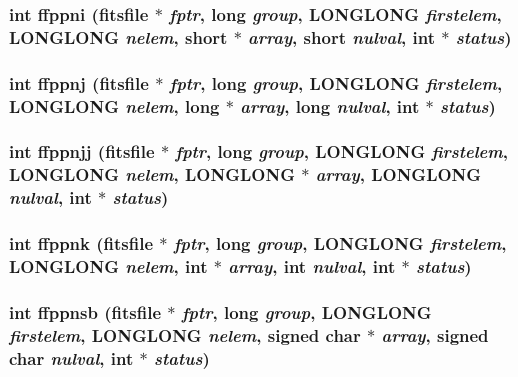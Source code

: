 \subsubsection{\setlength{\rightskip}{0pt plus 5cm}int ffppni (\bf{fitsfile} $\ast$ {\em fptr}, long {\em group}, \bf{LONGLONG} {\em firstelem}, \bf{LONGLONG} {\em nelem}, short $\ast$ {\em array}, short {\em nulval}, int $\ast$ {\em status})}\label{fitsio_8h_784592ce7e18c4280a1956b6f39cc70f}


\subsubsection{\setlength{\rightskip}{0pt plus 5cm}int ffppnj (\bf{fitsfile} $\ast$ {\em fptr}, long {\em group}, \bf{LONGLONG} {\em firstelem}, \bf{LONGLONG} {\em nelem}, long $\ast$ {\em array}, long {\em nulval}, int $\ast$ {\em status})}\label{fitsio_8h_4a7b775c21b67c8744fbd23f9a3c1789}


\subsubsection{\setlength{\rightskip}{0pt plus 5cm}int ffppnjj (\bf{fitsfile} $\ast$ {\em fptr}, long {\em group}, \bf{LONGLONG} {\em firstelem}, \bf{LONGLONG} {\em nelem}, \bf{LONGLONG} $\ast$ {\em array}, \bf{LONGLONG} {\em nulval}, int $\ast$ {\em status})}\label{fitsio_8h_76ad1e16557d84ed3f528848a243db06}


\subsubsection{\setlength{\rightskip}{0pt plus 5cm}int ffppnk (\bf{fitsfile} $\ast$ {\em fptr}, long {\em group}, \bf{LONGLONG} {\em firstelem}, \bf{LONGLONG} {\em nelem}, int $\ast$ {\em array}, int {\em nulval}, int $\ast$ {\em status})}\label{fitsio_8h_eb3b195b63cb8a9b04d47cf6b8fda66a}


\subsubsection{\setlength{\rightskip}{0pt plus 5cm}int ffppnsb (\bf{fitsfile} $\ast$ {\em fptr}, long {\em group}, \bf{LONGLONG} {\em firstelem}, \bf{LONGLONG} {\em nelem}, signed char $\ast$ {\em array}, signed char {\em nulval}, int $\ast$ {\em status})}\label{fitsio_8h_d663bf4dbce34e909c2eb15c2da1a376}


